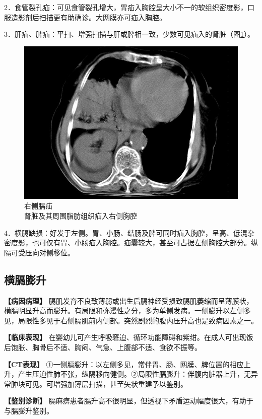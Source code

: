 2．食管裂孔疝：可见食管裂孔增大，胃疝入胸腔呈大小不一的软组织密度影，口服造影剂后扫描更有助确诊。大网膜亦可疝入胸腔。

3．肝疝、脾疝：平扫、增强扫描与肝或脾相一致，少数可见疝入的肾脏（图\ref{fig9-48}）。

\begin{figure}[!htbp]
 \centering
 \includegraphics[width=.7\textwidth,height=\textheight,keepaspectratio]{./images/Image00246.jpg}
 \captionsetup{justification=centering}
 \caption{右侧膈疝\\{\small 肾脏及其周围脂肪组织疝入右侧胸腔}}
 \label{fig9-48}
  \end{figure} 

4．横膈缺损：好发于左侧。胃、小肠、结肠及脾可同时疝入胸腔，呈高、低混杂密度影，也可仅有胃、小肠疝入胸腔。疝囊较大，甚至可占据左侧胸腔大部分。纵隔可受压向对侧移位。

\subsection{横膈膨升}

\textbf{【病因病理】}
膈肌发育不良致薄弱或出生后膈神经受损致膈肌萎缩而呈薄膜状，横膈明显升高而膨升。有局限和弥漫性之分，多为单侧发病。一侧膨升以左侧多见，局限性多见于右侧膈肌前内侧部。突然剧烈的腹内压升高也是致病因素之一。

\textbf{【临床表现】}
在婴幼儿可产生呼吸窘迫、循环功能障碍和紫绀。在成人可出现饭后饱胀、胸骨后不适、胸闷、气急、上腹部不适、食欲不振等。

\textbf{【CT表现】}
①一侧膈膨升：以左侧多见，常伴胃、肠、网膜、脾位置的相应上升，产生压迫性肺不张，纵隔移向健侧。②局限性膈膨升：伴腹内脏器上升，无异常肿块可见。可增强加薄层扫描，甚至矢状重建予以鉴别。

\textbf{【鉴别诊断】}
膈麻痹患者膈升高不很明显，但透视下矛盾运动幅度很大，有助于与膈膨升鉴别。

